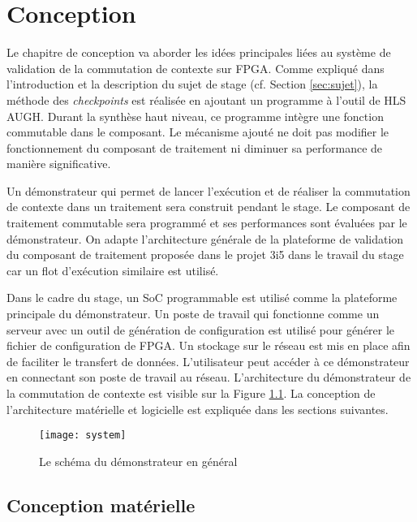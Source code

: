 \chapter{Conception}
\label{chap:concep}
\OnehalfSpacing

Le chapitre de conception va aborder les idées principales liées 
au système de validation de la commutation de contexte sur FPGA.
Comme expliqué dans l'introduction et la description du sujet de stage 
(cf. Section \ref{sec:sujet}), la méthode des \emph{checkpoints} 
est réalisée en ajoutant un programme à l'outil de HLS AUGH.
Durant la synthèse haut niveau, ce programme intègre une fonction
commutable dans le composant. Le mécanisme ajouté ne doit pas modifier le fonctionnement 
du composant de traitement ni diminuer sa performance de manière significative.

Un démonstrateur qui permet de lancer l'exécution et de réaliser la commutation
de contexte dans un traitement sera construit pendant le stage.
Le composant de traitement commutable sera programmé
et ses performances sont évaluées par le démonstrateur.
On adapte l'architecture générale de la plateforme de validation du composant de traitement
proposée dans le projet 3i5 dans le travail du stage car un flot d'exécution similaire est utilisé.

Dans le cadre du stage, un SoC programmable est utilisé comme la plateforme principale du démonstrateur.
Un poste de travail qui fonctionne comme un serveur avec un outil de génération de configuration
est utilisé pour générer le fichier de configuration de FPGA. 
Un stockage sur le réseau est mis en place afin de faciliter le transfert de données.
L'utilisateur peut accéder à ce démonstrateur en connectant son poste de travail au réseau.
L'architecture du démonstrateur de la commutation de contexte est visible sur la Figure \ref{fig:system}.
La conception de l'architecture matérielle et logicielle est expliquée dans les sections suivantes.

\begin{figure}[h]
	\centering
	\texttt{[image: system]}
	\caption{Le schéma du démonstrateur en général}
	\label{fig:system}
	\vspace{-2mm}
\end{figure} 

\section{Conception matérielle}
\label{sec:concephard}

